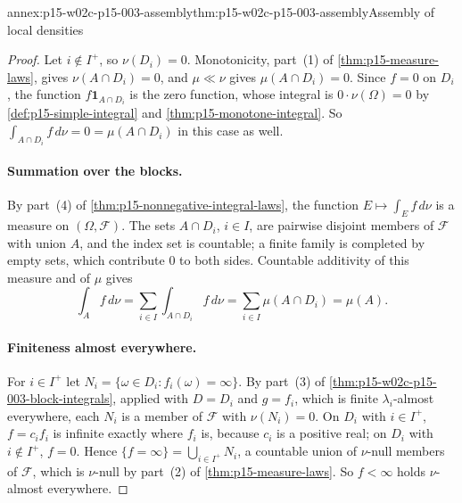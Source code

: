 \begin{annexitem}{annex:p15-w02c-p15-003-assembly}{thm:p15-w02c-p15-003-assembly}{Assembly of local densities}
\begin{proof}
Let \(i\notin I^+\), so \(\nu(D_i)=0\). Monotonicity, part~(1) of
\cref{thm:p15-measure-laws}, gives \(\nu(A\cap D_i)=0\), and \(\mu\ll\nu\)
gives \(\mu(A\cap D_i)=0\). Since \(f=0\) on \(D_i\), the function
\(f\mathbf1_{A\cap D_i}\) is the zero function, whose integral is
\(0\cdot\nu(\Omega)=0\) by \cref{def:p15-simple-integral} and
\cref{thm:p15-monotone-integral}. So
\(\int_{A\cap D_i}f\,d\nu=0=\mu(A\cap D_i)\) in this case as well.

\paragraph{Summation over the blocks.}
By part~(4) of \cref{thm:p15-nonnegative-integral-laws}, the function
\(E\mapsto\int_Ef\,d\nu\) is a measure on \((\Omega,\mathcal F)\). The sets
\(A\cap D_i\), \(i\in I\), are pairwise disjoint members of \(\mathcal F\)
with union \(A\), and the index set is countable; a finite family is
completed by empty sets, which contribute \(0\) to both sides. Countable
additivity of this measure and of \(\mu\) gives
\[
 \int_Af\,d\nu=\sum_{i\in I}\int_{A\cap D_i}f\,d\nu
              =\sum_{i\in I}\mu(A\cap D_i)=\mu(A).
\]

\paragraph{Finiteness almost everywhere.}
For \(i\in I^+\) let \(N_i=\{\omega\in D_i:f_i(\omega)=\infty\}\). By
part~(3) of \cref{thm:p15-w02c-p15-003-block-integrals}, applied with
\(D=D_i\) and \(g=f_i\), which is finite \(\lambda_i\)-almost everywhere,
each \(N_i\) is a member of \(\mathcal F\) with \(\nu(N_i)=0\). On \(D_i\)
with \(i\in I^+\), \(f=c_if_i\) is infinite exactly where \(f_i\) is,
because \(c_i\) is a positive real; on \(D_i\) with \(i\notin I^+\), \(f=0\).
Hence \(\{f=\infty\}=\bigcup_{i\in I^+}N_i\), a countable union of
\(\nu\)-null members of \(\mathcal F\), which is \(\nu\)-null by part~(2) of
\cref{thm:p15-measure-laws}. So \(f<\infty\) holds \(\nu\)-almost everywhere.


\end{proof}
\end{annexitem}
